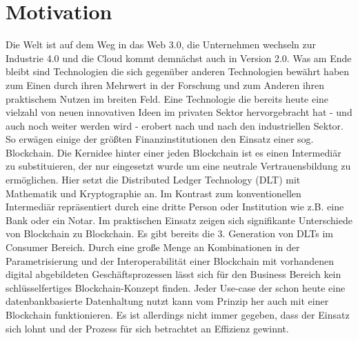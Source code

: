 \section{Motivation}
Die Welt ist auf dem Weg in das Web 3.0, die Unternehmen wechseln zur Industrie 4.0 und die Cloud kommt demnächst auch in Version 2.0.
Was am Ende bleibt sind Technologien die sich gegenüber anderen Technologien bewährt haben zum Einen durch ihren Mehrwert in der Forschung und zum Anderen ihren praktischem Nutzen im breiten Feld.
Eine Technologie die bereits heute eine vielzahl von neuen innovativen Ideen im privaten Sektor hervorgebracht hat  - und auch noch weiter werden wird - erobert nach und nach den industriellen Sektor. So erwägen einige der größten Finanzinstitutionen den Einsatz einer sog. Blockchain.
Die Kernidee hinter einer jeden Blockchain ist es einen Intermediär zu substituieren, der nur eingesetzt wurde um eine neutrale Vertrauensbildung zu ermöglichen. Hier setzt die Distributed Ledger Technology (DLT) mit Mathematik und Kryptographie an. Im Kontrast zum konventionellen Intermediär repräsentiert durch eine dritte Person oder Institution wie z.B. eine Bank oder ein Notar.
Im praktischen Einsatz zeigen sich signifikante Unterschiede von Blockchain zu Blockchain. Es gibt bereits die 3. Generation von DLTs im Consumer Bereich. Durch eine große Menge an Kombinationen in der Parametrisierung und der Interoperabilität einer Blockchain mit vorhandenen digital abgebildeten Geschäftsprozessen lässt sich für den Business Bereich kein schlüsselfertiges Blockchain-Konzept finden. Jeder Use-case der schon heute eine datenbankbasierte Datenhaltung nutzt kann vom Prinzip her auch mit einer Blockchain funktionieren. Es ist allerdings nicht immer gegeben, dass der Einsatz sich lohnt und der Prozess für sich betrachtet an Effizienz gewinnt.

\newpage